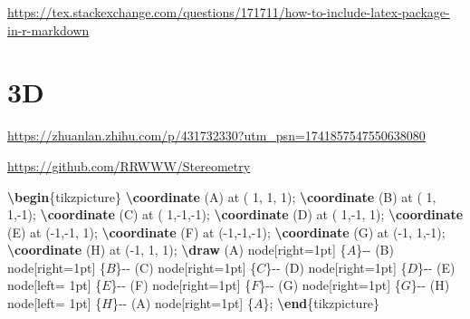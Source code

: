 \documentclass[
]{book}
\newenvironment{Shaded}{\begin{snugshade}}{\end{snugshade}}
\newcommand{\ExtensionTok}[1]{#1}
\newcommand{\FunctionTok}[1]{\textcolor[rgb]{0.13,0.29,0.53}{\textbf{#1}}}
\newcommand{\KeywordTok}[1]{\textcolor[rgb]{0.13,0.29,0.53}{\textbf{#1}}}
\newcommand{\NormalTok}[1]{#1}
\newcommand{\SpecialStringTok}[1]{\textcolor[rgb]{0.31,0.60,0.02}{#1}}
\theoremstyle{definition}
\theoremstyle{definition}
\theoremstyle{definition}
\theoremstyle{definition}
\theoremstyle{remark}
\begin{document}
\url{https://tex.stackexchange.com/questions/171711/how-to-include-latex-package-in-r-markdown}

\hypertarget{d-1}{%
\section{3D}\label{d-1}}

\url{https://zhuanlan.zhihu.com/p/431732330?utm_psn=1741857547550638080}

\url{https://github.com/RRWWW/Stereometry}

\begin{Shaded}
\begin{Highlighting}[]
\KeywordTok{\textbackslash{}begin}\NormalTok{\{}\ExtensionTok{tikzpicture}\NormalTok{\}}
  \FunctionTok{\textbackslash{}coordinate}\NormalTok{ (A) at ( 1, 1, 1);}
  \FunctionTok{\textbackslash{}coordinate}\NormalTok{ (B) at ( 1, 1,{-}1);}
  \FunctionTok{\textbackslash{}coordinate}\NormalTok{ (C) at ( 1,{-}1,{-}1);}
  \FunctionTok{\textbackslash{}coordinate}\NormalTok{ (D) at ( 1,{-}1, 1);}
  \FunctionTok{\textbackslash{}coordinate}\NormalTok{ (E) at ({-}1,{-}1, 1);}
  \FunctionTok{\textbackslash{}coordinate}\NormalTok{ (F) at ({-}1,{-}1,{-}1);}
  \FunctionTok{\textbackslash{}coordinate}\NormalTok{ (G) at ({-}1, 1,{-}1);}
  \FunctionTok{\textbackslash{}coordinate}\NormalTok{ (H) at ({-}1, 1, 1);}
  \FunctionTok{\textbackslash{}draw}\NormalTok{ (A) node[right=1pt] \{}\SpecialStringTok{$A$}\NormalTok{\}{-}{-}}
\NormalTok{        (B) node[right=1pt] \{}\SpecialStringTok{$B$}\NormalTok{\}{-}{-}}
\NormalTok{        (C) node[right=1pt] \{}\SpecialStringTok{$C$}\NormalTok{\}{-}{-}}
\NormalTok{        (D) node[right=1pt] \{}\SpecialStringTok{$D$}\NormalTok{\}{-}{-}}
\NormalTok{        (E) node[left= 1pt] \{}\SpecialStringTok{$E$}\NormalTok{\}{-}{-}}
\NormalTok{        (F) node[right=1pt] \{}\SpecialStringTok{$F$}\NormalTok{\}{-}{-}}
\NormalTok{        (G) node[right=1pt] \{}\SpecialStringTok{$G$}\NormalTok{\}{-}{-}}
\NormalTok{        (H) node[left= 1pt] \{}\SpecialStringTok{$H$}\NormalTok{\}{-}{-}}
\NormalTok{        (A) node[right=1pt] \{}\SpecialStringTok{$A$}\NormalTok{\};}
\KeywordTok{\textbackslash{}end}\NormalTok{\{}\ExtensionTok{tikzpicture}\NormalTok{\}}
\end{Highlighting}
\end{Shaded}
\end{document}
